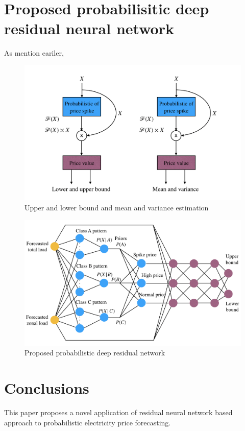 \documentclass[review]{elsarticle}
\begin{document}
\section{Proposed probabilisitic deep residual neural network}
  As mention eariler,

  \begin{figure}[H]
    \caption{Upper and lower bound and mean and variance estimation}
    \label{Fig:UB_LB_MV_PDRN}
    \includegraphics[width=12cm]{UB_LB_MV_PDRN}
  \centering
  \end{figure}

  \begin{figure}[H]
    \caption{Proposed probabilistic deep residual network}
    \label{Fig:proposed_PDRN}
    \includegraphics[width=12cm]{proposed_PDRN}
  \centering
  \end{figure}


\section{Conclusions}
This paper proposes a novel application of residual neural network based approach to probabilistic electricity price forecasting.
\end{document}
